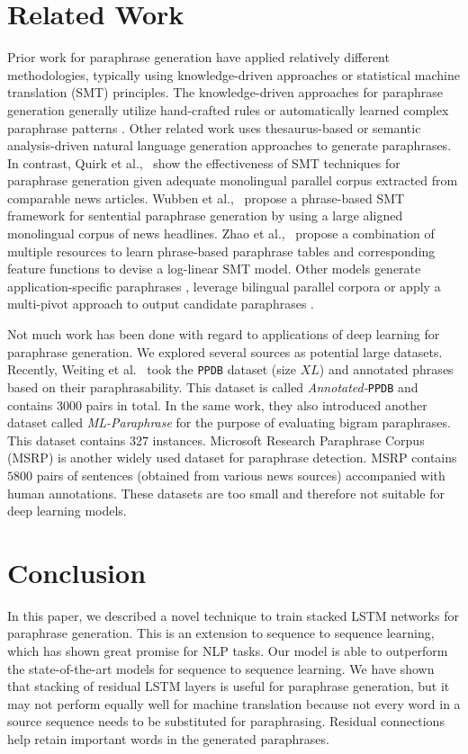 \section{Related Work}
Prior work for paraphrase generation have applied relatively different methodologies, typically using knowledge-driven approaches or statistical machine translation (SMT) principles. The knowledge-driven approaches for paraphrase generation \cite{Madnani2010} generally utilize hand-crafted rules \cite{McKeown1983} or automatically learned complex paraphrase patterns \cite{Zhao2009}. Other related work uses thesaurus-based \cite{Hassan2007} or semantic analysis-driven natural language generation approaches \cite{Kozlowski2003} to generate paraphrases. In contrast, Quirk et al.,~\cite{quirk2004} show the effectiveness of SMT techniques for paraphrase generation given adequate monolingual parallel corpus extracted from comparable news articles. Wubben et al.,~\cite{Wubben2010} propose a phrase-based SMT framework for sentential paraphrase generation by using a large aligned monolingual corpus of news headlines. Zhao et al.,~\cite{Zhao08} propose a combination of multiple resources to learn phrase-based paraphrase tables and corresponding feature functions to devise a log-linear SMT model. Other models generate application-specific paraphrases \cite{Zhao2009}, leverage bilingual parallel corpora \cite{Bannard05} or apply a multi-pivot approach to output candidate paraphrases \cite{ZhaoWLL10}.
 
Not much work has been done with regard to applications of deep learning for paraphrase generation. We explored several sources as potential large datasets. Recently, Weiting et al.~\cite{wieting2015ppdb} took the \texttt{PPDB} dataset (size $XL$) and annotated phrases based on their paraphrasability. This dataset is called \emph{Annotated-}\texttt{PPDB} and contains $3000$ pairs in total. In the same work, they also introduced another dataset called \emph{ML-Paraphrase} for the purpose of
evaluating bigram paraphrases. This dataset contains $327$ instances. Microsoft Research Paraphrase Corpus (MSRP) \cite{dolan2005microsoft} is another widely used dataset for paraphrase detection. MSRP contains $5800$ pairs of sentences (obtained from various news sources) accompanied with human annotations. These datasets are too small and therefore not suitable for deep learning models.
 
   
\section{Conclusion}
        In this paper, we described a novel technique to train stacked LSTM networks for paraphrase generation. This is an extension to sequence to sequence learning, which has shown great promise for NLP tasks. Our model is able to outperform the state-of-the-art models for sequence to sequence learning. We have shown that stacking of residual LSTM layers is useful for paraphrase generation, but it may not perform equally well for machine translation because not every word in a source sequence needs to be substituted for paraphrasing. Residual connections help retain important words in the generated paraphrases.
      
